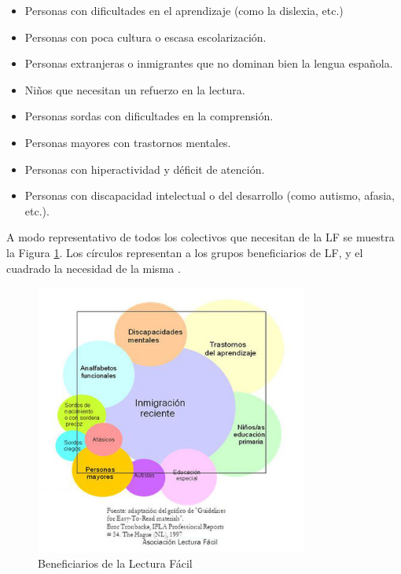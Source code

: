 \begin{itemize}
	\item Personas con dificultades en el aprendizaje (como la dislexia, etc.)	 
	\item Personas con poca cultura o escasa escolarización.	 
	\item Personas extranjeras o inmigrantes que no dominan bien la lengua española.
	\item Niños que necesitan un refuerzo en la lectura.
	\item Personas sordas con dificultades en la comprensión.
	\item Personas mayores con trastornos mentales.
	\item Personas con hiperactividad y  déficit de atención. 
	\item Personas con discapacidad intelectual o del desarrollo (como autismo, afasia, etc.). 
\end{itemize}
	A modo representativo de todos los colectivos que necesitan de la LF se muestra la Figura \ref{fig:destinatarios}. Los círculos representan a los grupos beneficiarios de LF, y el cuadrado la necesidad de la misma \citep{nomura2010guidelines}. 
	\begin{figure}[htb]
		\centering
		\includegraphics[width=0.8\textwidth]{Imagenes/Ejemplos/destinatarios}
		\caption{Beneficiarios de la Lectura Fácil}
		\label{fig:destinatarios}
	\end{figure}
	

	



